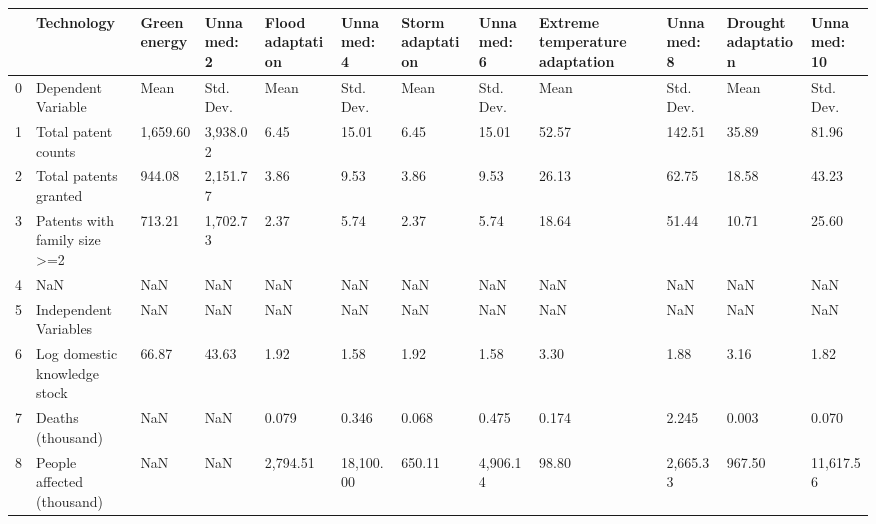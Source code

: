 \begin{tabular}{llllllllllll}
\toprule
{} &                                         Technology & Green energy & Unnamed: 2 & Flood adaptation & Unnamed: 4 & Storm adaptation & Unnamed: 6 & Extreme temperature adaptation & Unnamed: 8 & Drought adaptation & Unnamed: 10 \\
\midrule
0  &                                 Dependent Variable &         Mean &  Std. Dev. &             Mean &  Std. Dev. &             Mean &  Std. Dev. &                           Mean &  Std. Dev. &               Mean &   Std. Dev. \\
1  &                                Total patent counts &     1,659.60 &   3,938.02 &             6.45 &      15.01 &             6.45 &      15.01 &                          52.57 &     142.51 &              35.89 &       81.96 \\
2  &                              Total patents granted &       944.08 &   2,151.77 &             3.86 &       9.53 &             3.86 &       9.53 &                          26.13 &      62.75 &              18.58 &       43.23 \\
3  &                       Patents with family size >=2 &       713.21 &   1,702.73 &             2.37 &       5.74 &             2.37 &       5.74 &                          18.64 &      51.44 &              10.71 &       25.60 \\
4  &                                                NaN &          NaN &        NaN &              NaN &        NaN &              NaN &        NaN &                            NaN &        NaN &                NaN &         NaN \\
5  &                              Independent Variables &          NaN &        NaN &              NaN &        NaN &              NaN &        NaN &                            NaN &        NaN &                NaN &         NaN \\
6  &                       Log domestic knowledge stock &        66.87 &      43.63 &             1.92 &       1.58 &             1.92 &       1.58 &                           3.30 &       1.88 &               3.16 &        1.82 \\
7  &                                  Deaths (thousand) &          NaN &        NaN &            0.079 &      0.346 &            0.068 &      0.475 &                          0.174 &      2.245 &              0.003 &       0.070 \\
8  &                         People affected (thousand) &          NaN &        NaN &         2,794.51 &  18,100.00 &           650.11 &   4,906.14 &                          98.80 &   2,665.33 &             967.50 &   11,617.56 \\

\end{tabular}
